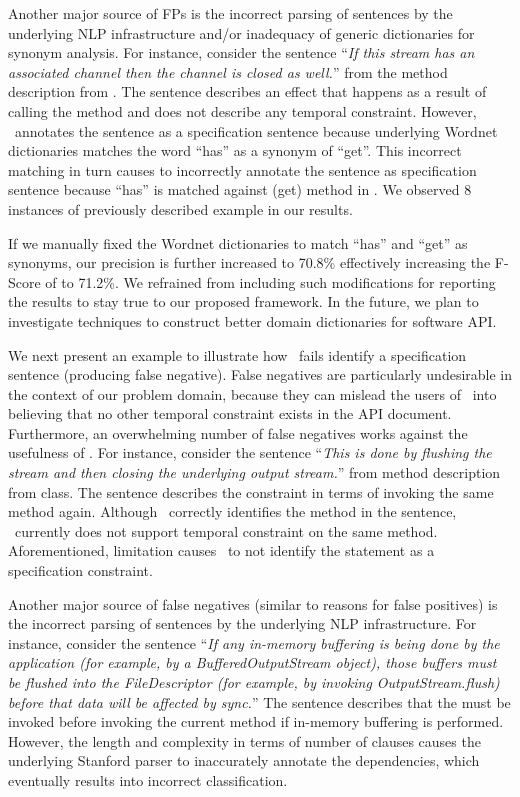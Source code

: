 Another major source of FPs is the incorrect parsing of sentences by the underlying NLP infrastructure and/or inadequacy of generic dictionaries for synonym analysis. For instance, consider the sentence ``\textit{If this stream has an associated channel then the channel is closed as well.}'' from the  method description from . The sentence describes an effect that happens as a result of calling the  method and does not describe any temporal constraint. However, \tool\ annotates the sentence as a specification sentence because underlying Wordnet dictionaries matches the word ``has'' as a synonym of ``get''. This incorrect matching in turn causes \tool to incorrectly annotate the sentence as specification sentence because ``has'' is matched against \CodeIn(get) method in . We observed 8 instances of previously described example in our results.

If we manually fixed the Wordnet dictionaries to match ``has'' and ``get'' as synonyms, our precision is further increased to 70.8\% effectively increasing the F-Score of \tool to 71.2\%. We refrained from including such modifications for reporting the results to stay true to our proposed framework. In the future, we plan to investigate techniques to construct better domain dictionaries for software API.

We next present an example to illustrate how \tool\ fails identify a specification sentence (producing false negative). False negatives are particularly undesirable in the context of our problem domain, because they can mislead the users of \tool\ into believing that no other temporal constraint exists in the API document. Furthermore, an overwhelming number of false negatives works against the usefulness of \tool. For instance, consider the sentence ``\textit{This is done by flushing the stream and then closing the underlying output stream.}'' from   method description from  class. The sentence describes the constraint in terms of invoking the same method again. Although \tool\ correctly identifies the method  in the sentence, \tool\ currently does not support temporal constraint on the same method. Aforementioned, limitation causes \tool\ to not identify the statement as a specification constraint.   


Another major source of false negatives (similar to reasons for false positives) is the incorrect parsing of sentences by the underlying NLP infrastructure. For instance, consider the sentence ``\textit{If any in-memory buffering is being done by the application (for example, by a BufferedOutputStream object), those buffers must be flushed into the FileDescriptor (for example, by invoking OutputStream.flush) before that data will be affected by sync.}'' The sentence describes that the  must be invoked before invoking the current method if in-memory buffering is performed. However, the length and complexity in terms of number of clauses causes the underlying Stanford parser to inaccurately annotate the dependencies, which eventually results into incorrect classification. 

